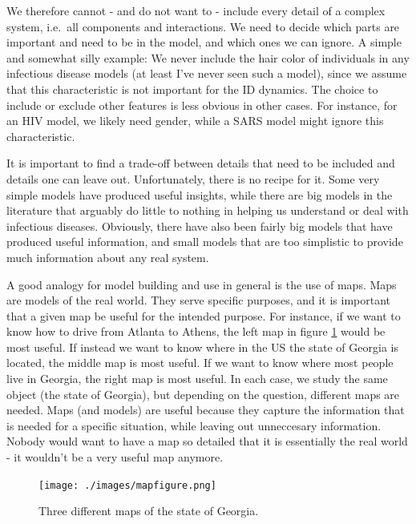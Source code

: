 \documentclass[]{book}
\theoremstyle{definition}
\theoremstyle{definition}
\theoremstyle{definition}
\theoremstyle{remark}
\begin{document}
We therefore cannot - and do not want to - include every detail of a
complex system, i.e.~all components and interactions. We need to decide
which parts are important and need to be in the model, and which ones we
can ignore. A simple and somewhat silly example: We never include the
hair color of individuals in any infectious disease models (at least
I've never seen such a model), since we assume that this characteristic
is not important for the ID dynamics. The choice to include or exclude
other features is less obvious in other cases. For instance, for an HIV
model, we likely need gender, while a SARS model might ignore this
characteristic.

It is important to find a trade-off between details that need to be
included and details one can leave out. Unfortunately, there is no
recipe for it. Some very simple models have produced useful insights,
while there are big models in the literature that arguably do little to
nothing in helping us understand or deal with infectious diseases.
Obviously, there have also been fairly big models that have produced
useful information, and small models that are too simplistic to provide
much information about any real system.

A good analogy for model building and use in general is the use of maps.
Maps are models of the real world. They serve specific purposes, and it
is important that a given map be useful for the intended purpose. For
instance, if we want to know how to drive from Atlanta to Athens, the
left map in figure \ref{fig:mapfigure} would be most useful. If instead
we want to know where in the US the state of Georgia is located, the
middle map is most useful. If we want to know where most people live in
Georgia, the right map is most useful. In each case, we study the same
object (the state of Georgia), but depending on the question, different
maps are needed. Maps (and models) are useful because they capture the
information that is needed for a specific situation, while leaving out
unneccesary information. Nobody would want to have a map so detailed
that it is essentially the real world - it wouldn't be a very useful map
anymore.

\begin{figure}
\centering
\texttt{[image: ./images/mapfigure.png]}
\caption{\label{fig:mapfigure}Three different maps of the state of Georgia.}
\end{figure}
\end{document}
